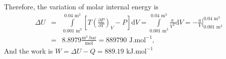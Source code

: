 \documentclass[calculator,steamtables,allquestions,datasheet,resit,solution]{exam_newMarcus2}
\newcommand{\frc}{\displaystyle\frac}
\renewcommand{\d}[1]{\mathrm{d} #1 }
\begin{document}
\begin{question}
\begin{enumerate}[(a)]
{       Therefore, the variation of molar internal energy is~
       \begin{eqnarray}
         \Delta U &=& \int\limits_{0.001\text{ m}^{3}}^{0.04\text{ m}^{3}}\left[T\left(\frc{\partial P}{\partial T}\right)_{V}-P\right]\d V = \int\limits_{0.001\text{ m}^{3}}^{0.04\text{ m}^{3}} \frc{a}{V^{2}} \d V = -\left.\frc{a}{V}\right|_{0.001\text{ m}^{3}}^{0.04\text{ m}^{3}} \nonumber \\
                  &=& 8.8979\frc{\text{m}^{3}.\text{bar}}{\text{mol}} = 889790\text{ J.mol}^{-1}, \nonumber
       \end{eqnarray}
       And the work is $W= \Delta U - Q=889.19\text{ kJ.mol}^{-1}$~

}
%
\end{enumerate} 
%
\end{question}

\clearpage
\end{document}
